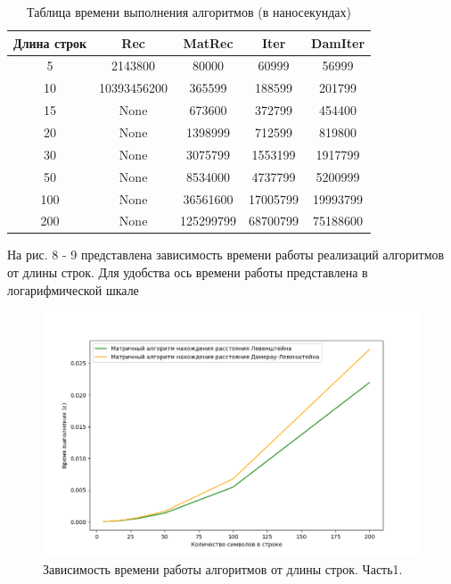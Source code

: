 \documentclass[14pt,russian]{scrartcl}
\begin{document}
	\begin{table} [h!]
	\caption{Таблица времени выполнения алгоритмов (в наносекундах)}
	\begin{center}
		\begin{tabular}{|c c c c c|} 
		 	\hline
			Длина строк & Rec & MatRec & Iter & DamIter \\  
		 	\hline
		 	5 & 2143800 & 80000 & 60999 & 56999\\
		 	\hline
		 	10 & 10393456200 & 365599 & 188599 & 201799\\
		 	\hline
		 	15 & None  & 673600 & 372799 & 454400\\
		 	\hline
		 	20 & None  & 1398999 & 712599 & 819800 \\
		 	\hline
			30 & None  & 3075799 & 1553199 & 1917799 \\
			\hline
			50 & None  & 8534000 & 4737799 & 5200999 \\
			\hline
			100 & None  & 36561600 & 17005799 & 19993799\\
			\hline
			200 & None  & 125299799 & 68700799 & 75188600 \\
			\hline
		\end{tabular}
	\end{center}
	\label{tar:bench}
\end{table}
\clearpage

	\pagebreak

	На рис. 8 - 9 представлена зависимость времени работы реализаций алгоритмов от длины строк. Для удобства ось времени работы представлена в логарифмической шкале
	
	
	\begin{figure}[h]
	\begin{center}
	\includegraphics[scale=0.7]{time1.png}
	 \caption{Зависимость времени работы алгоритмов от длины строк. Часть1.}
	\end{center}
	\label{fig:plot}
\end{figure}
\end{document}
